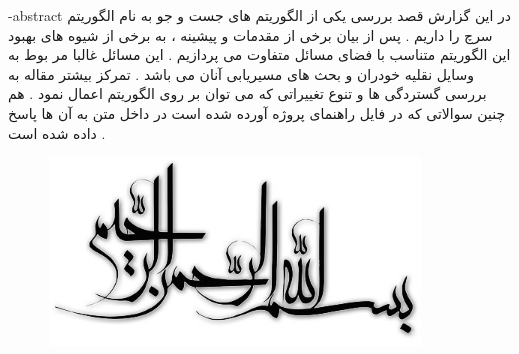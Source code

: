 \graphicspath{ {./img} }
\fa-abstract{
در این گزارش قصد بررسی یکی از الگوریتم های جست و جو به نام الگوریتم سرچ 
را داریم . پس از بیان برخی از مقدمات و پیشینه ، به برخی از شیوه های بهبود این الگوریتم متناسب با فضای مسائل متفاوت می پردازیم . این مسائل غالبا مر بوط به وسایل نقلیه خودران و بحث های مسیریابی آنان می باشد . تمرکز بیشتر مقاله به بررسی گستردگی ها و تنوع تغییراتی که می توان بر روی الگوریتم 
اعمال نمود . هم چنین سوالاتی که در فایل راهنمای پروژه آورده شده است در داخل متن به آن ها پاسخ داده شده است .
}


\renewcommand{\bibname}{مراجع}



\AUTtitle
\vspace*{7cm}
\thispagestyle{empty}
\begin{center}
\includegraphics[height=5cm,width=12cm]{besm}
\end{center}